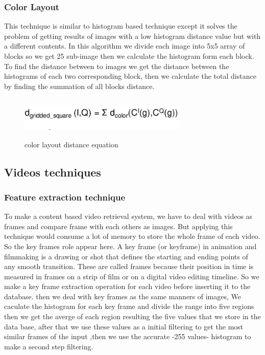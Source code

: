   \vskip 0.2in
\subsubsection{Color Layout}
This technique is similar to histogram based technique except it solves the problem of getting results of images with a low 
histogram distance value but with a different contents.
\vskip 0.2in
In this algorithm we divide each image into 5x5 array of blocks so we get 25 sub-image then we calculate the histogram form each block.
To find the distance between to images we get the distance between the histograms of each two corresponding block, 
then we calculate the total distance by finding the summation of all blocks distance.
\vskip 0.2in

\begin{figure}[H]
    \centering
    \includegraphics[width=80mm,height=20mm]{Images/cl.png}
    \caption{color layout distance equation}
  \end{figure}
  
  \vskip 0.2in

\subsection{Videos techniques}
\subsubsection{Feature extraction technique}
\vskip 0.2in
To make a content based video retrieval system, we have to deal with videos as frames and compare frame with each others as images.
But applying this technique would consume a lot of memory to store the whole frame of each video.
So the key frames role appear here.
\vskip 0.2in
A key frame (or keyframe) in animation and filmmaking is a drawing or shot that defines the starting 
and ending points of any smooth transition. These are called frames because their position in time is measured in 
frames on a strip of film or on a digital video editing timeline.
\vskip 0.2in
So we make a key frame extraction operation for each video before inserting it to the database.
then we deal with key frames as the same manners of images, We caculate the histogram for each key frame and divide the range into 
five regions then we get the averge of each region resulting the five values that we store in the data base, after that we use these values
as a initial filtering to get the most similar frames of the input ,then we use the accurate -255 values- histogram to make a second step filtering.
\vskip 0.2in
